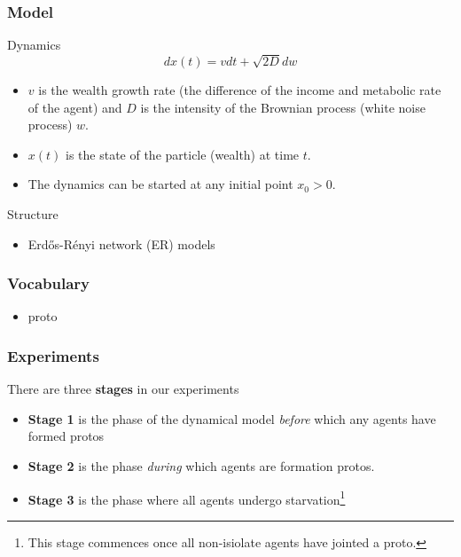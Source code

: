 \documentclass{beamer}
\begin{document}
\begin{frame}[t]
\frametitle{Model}

Dynamics
\begin{equation}\label{ddm}
dx(t) = vdt + \sqrt{2D} dw
\end{equation}

\begin{itemize}
\item $v$ is the wealth growth rate (the difference of the income and metabolic rate of the agent) and $D$ is the intensity of the Brownian process (white noise process) $w$. 
\item $x(t)$ is the state of the particle (wealth) at time $t$. 
\item The dynamics can be started at any initial point $x_0 > 0$. 
\end{itemize}
Structure
\begin{itemize}
\item Erd\H{o}s-R\'{e}nyi network (ER) models
\end{itemize}
\end{frame}

\begin{frame}[t]
\frametitle{Vocabulary}
\begin{itemize}
\item proto
\end{itemize}
\end{frame}

\begin{frame}[t]
\frametitle{Experiments}
There are three \textbf{stages} in our experiments
\begin{itemize}
\item \textbf{Stage 1} is the phase of the dynamical model \textit{before} which any agents have formed protos
\item \textbf{Stage 2} is the phase \textit{during} which agents are formation protos.
\item \textbf{Stage 3} is the phase where all agents undergo starvation\footnote{This stage commences once all non-isiolate agents have jointed a proto.} 
\end{itemize}
\end{frame}
\end{document}
